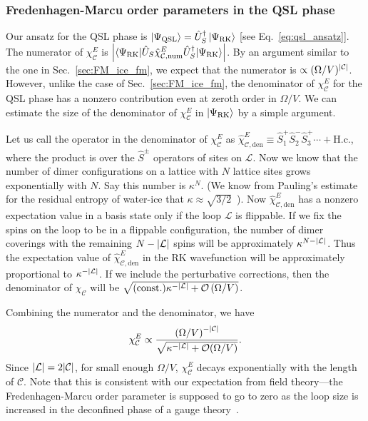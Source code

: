 \documentclass[twocolumn,superscriptaddress,amsmath,amssymb,aps,prx,nofootinbib]{revtex4-2}
\begin{document}
\subsubsection{Fredenhagen-Marcu order parameters in the QSL phase} \label{sec:FM_qsl}

Our ansatz for the QSL phase is $\ket{\Psi_{\text{QSL}}} = \hat{U}_{S}^\dagger \ket{\Psi_{\text{RK}}}$ [see Eq.~\eqref{eq:qsl_ansatz}]. 
The numerator of $\chi_{\mathcal{C}}^E$ is $\abs{\langle \Psi_{\text{RK}} | \hat{U}_S \hat{\chi}_{\mathcal{C}, \text{num}}^E \hat{U}_S^\dagger | \Psi_{\text{RK}} \rangle} $.
By an argument similar to the one in  Sec.~\ref{sec:FM_ice_fm}, we expect that the numerator is $\propto (\Omega/V)^{\abs{\mathcal{C}}}$.
However, unlike the case of Sec.~\ref{sec:FM_ice_fm}, the denominator of $\chi_\mathcal{C}^E$ for the QSL phase has a nonzero contribution even at zeroth order in $\Omega/V$. 
We can estimate the size of the denominator of $\chi_{\mathcal{C}}^E$ in $\ket{\Psi_{\text{RK}}}$ by a simple argument.

Let us call the operator in the denominator of $\chi_\mathcal{C}^E$ as $\hat{\chi}_{\mathcal{C}, \text{den}}^E \equiv \hat{S}_1^+ \hat{S}_2^- \hat{S}_3^+\cdots + \text{H.c.}$, where the product is over the $\hat{S}^\pm$ operators of sites on $\mathcal{L}$. Now we know that the number of dimer configurations on a lattice with $N$ lattice sites grows exponentially with $N$. Say this number is $\kappa^N$. (We know from Pauling's estimate for the residual entropy of water-ice that $\kappa\approx \sqrt{3/2}$~\cite{pauling1935}). Now $\hat{\chi}_{\mathcal{C}, \text{den}}^E$ has a nonzero expectation value in a basis state only if the loop $\mathcal{L}$ is flippable. If we fix the spins on the loop to be in a flippable configuration, the number of dimer coverings with the remaining $N-\abs{\mathcal{L}}$ spins will be approximately $\kappa^{N-\abs{\mathcal{L}}}$. Thus the expectation value of $\hat{\chi}_{\mathcal{C}, \text{den}}^E$ in the RK wavefunction will be approximately proportional to $\kappa^{-\abs{\mathcal{L}}}$. If we include the perturbative corrections, then the denominator of $\chi_\mathcal{C}$ will be $\sqrt{(\text{const.}) \kappa^{-\abs{\mathcal{L}}} + \mathcal{O} \left( \Omega/V\right)}$. 

Combining the numerator and the denominator, we have
\begin{equation}
    \chi_\mathcal{C}^E \propto \frac{\left(\Omega/V \right)^{-\abs{\mathcal{C}}}}{\sqrt{ \kappa^{-\abs{\mathcal{L}}} + \mathcal{O}(\Omega/V)}} .
\end{equation}
Since $\abs{\mathcal{L}} = 2 \abs{\mathcal{C}}$, for small enough $\Omega/V$, $\chi_\mathcal{C}^E$ decays exponentially with the length of $\mathcal{C}$. Note that this is consistent with our expectation from field theory---the Fredenhagen-Marcu order parameter is supposed to go to zero as the loop size is increased in the deconfined phase of a gauge theory~\cite{fredenhagen1983charged, fredenhagen1988dual}.
\end{document}
